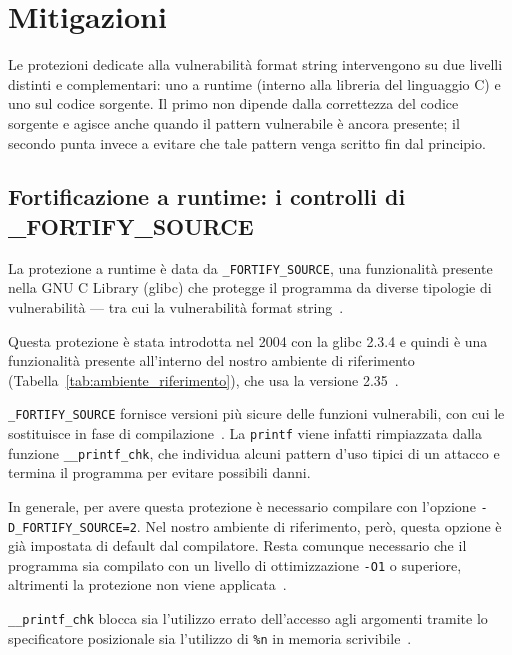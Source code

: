 \chapter{Mitigazioni}\label{chapter:mitigations}
Le protezioni dedicate alla vulnerabilità format string intervengono su due livelli distinti e complementari: uno a runtime (interno alla libreria del linguaggio C) e uno sul codice sorgente. Il primo non dipende dalla correttezza del codice sorgente e agisce anche quando il pattern vulnerabile è ancora presente; il secondo punta invece a evitare che tale pattern venga scritto fin dal principio.


\section{Fortificazione a runtime: i controlli di \_FORTIFY\_SOURCE}\label{sec:fortify_source}
La protezione a runtime è data da \texttt{\_FORTIFY\_SOURCE}, una funzionalità presente nella GNU C Library (glibc) che protegge il programma da diverse tipologie di vulnerabilità --- tra cui la vulnerabilità format string~\cite{openssfhardening}.

Questa protezione è stata introdotta nel 2004 con la glibc 2.3.4 e quindi è una funzionalità presente all'interno del nostro ambiente di riferimento (Tabella~\ref{tab:ambiente_riferimento}), che usa la versione 2.35~\cite{maskrayfortify}.

\texttt{\_FORTIFY\_SOURCE} fornisce versioni più sicure delle funzioni vulnerabili, con cui le sostituisce in fase di compilazione~\cite{glibcmanual}. La \texttt{printf} viene infatti rimpiazzata dalla funzione \texttt{\_\_printf\_chk}, che individua alcuni pattern d'uso tipici di un attacco e termina il programma per evitare possibili danni.

In generale, per avere questa protezione è necessario compilare con l'opzione \texttt{-D\_FORTIFY\_SOURCE=2}. Nel nostro ambiente di riferimento, però, questa opzione è già impostata di default dal compilatore. Resta comunque necessario che il programma sia compilato con un livello di ottimizzazione \texttt{-O1} o superiore, altrimenti la protezione non viene applicata~\cite{openssfhardening}.

\texttt{\_\_printf\_chk} blocca sia l'utilizzo errato dell'accesso agli argomenti tramite lo specificatore posizionale sia l'utilizzo di \texttt{\%n} in memoria scrivibile~\cite{captainplanet2010}.

